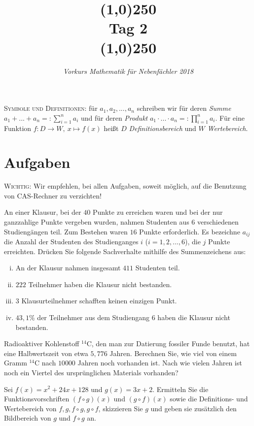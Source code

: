\documentclass[11pt]{article}
\begin{document}
\title{\line(1,0){250}\\Tag 2\\\line(1,0){250}}
\date{}
\author{\itshape Vorkurs Mathematik für Nebenfächler 2018}
\maketitle
\begin{framed}
	\noindent \scriptsize
	\textsc{Symbole und Definitionen:} für $a_1,a_2,...,a_n$ schreiben wir für deren \emph{Summe} $a_1+...+a_n=:\sum_{i=1}^n a_i$ und für deren \emph{Produkt} $a_1\cdot...\cdot a_n =: \prod_{i=1}^n a_i$. Für eine Funktion $f:D\to W,~x\mapsto f(x)$ heißt $D$ \emph{Definitionsbereich} und $W$ \emph{Wertebereich}.
\end{framed}
\section*{Aufgaben}
\textsc{Wichtig:} Wir empfehlen, bei allen Aufgaben, soweit möglich, auf die Benutzung von CAS-Rechner zu verzichten!
\begin{task}
An einer Klausur, bei der $40$ Punkte zu erreichen waren und bei der nur ganzzahlige Punkte
vergeben wurden, nahmen Studenten aus $6$ verschiedenen Studieng\"angen teil. Zum Bestehen
waren $16$ Punkte erforderlich. Es bezeichne $a_{ij}$ die Anzahl der Studenten des Studienganges
$i$ ($i = 1, 2, . . ., 6$), die $j$ Punkte erreichten. Dr\"ucken Sie folgende Sachverhalte mithilfe des
Summenzeichens aus:
\begin{enumerate}[i)]
	\item An der Klausur nahmen insgesamt $411$ Studenten teil.
	\item $222$ Teilnehmer haben die Klausur nicht bestanden.
	\item $3$ Klausurteilnehmer schafften keinen einzigen Punkt.
	\item $43,1 \%$ der Teilnehmer aus dem Studiengang $6$ haben die Klausur nicht bestanden.
\end{enumerate}
\end{task}
\begin{task}
	Radioaktiver Kohlenstoff $^{14}$C, den man zur Datierung fossiler Funde
	benutzt, hat eine Halbwertszeit von etwa $5,776$ Jahren. Berechnen Sie, wie viel
	von einem Gramm $^{14}$C nach $10 000$ Jahren noch vorhanden ist. Nach wie vielen Jahren ist noch ein Viertel des ursprünglichen Materials vorhanden?
\end{task}
\begin{task}
Sei $f(x)=x^2+24x+128$ und $g(x)=3x+2$. Ermitteln Sie die Funktionsvorschriften $(f \circ g)(x)$ und $(g \circ f)(x)$ sowie die Definitions- und Wertebereich von $f, g, f \circ g, g \circ f$, skizzieren Sie $g$ und geben sie zusätzlich den Bildbereich von $g$ und $f\circ g$ an. 
\end{task}
\end{document}
